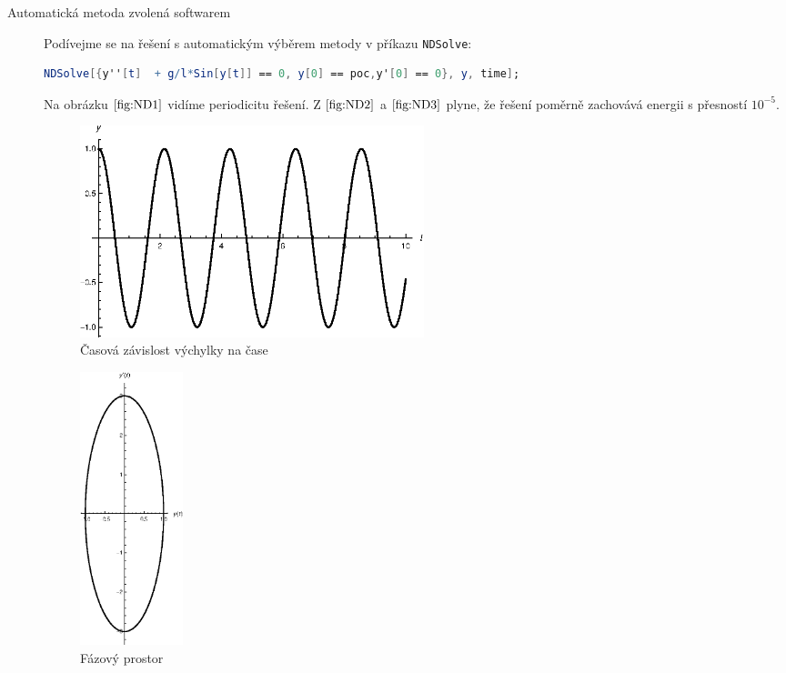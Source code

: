 \begin{description}
\item[Automatická metoda zvolená softwarem] Podívejme se na řešení s automatickým výběrem metody v příkazu \texttt{NDSolve}:

\begin{lstlisting}[language=Mathematica]
NDSolve[{y''[t]  + g/l*Sin[y[t]] == 0, y[0] == poc,y'[0] == 0}, y, time];
\end{lstlisting}

Na obrázku $\eqref{fig:ND1}$ vidíme periodicitu řešení. Z $\eqref{fig:ND2}$ a $\eqref{fig:ND3}$ plyne, že řešení poměrně zachovává energii s přesností $10^{-5}$.

\begin{figure}[h]
  \centering
  \includegraphics[width=10cm]{figures/ND1.eps}
  \caption{Časová závislost výchylky na čase}
  \label{fig:ND1}
\end{figure}

\begin{figure}[h]
  \centering
  \includegraphics[width=3cm]{figures/ND2.eps}
  \caption{Fázový prostor}
  \label{fig:ND2}
\end{figure}


\end{description}
